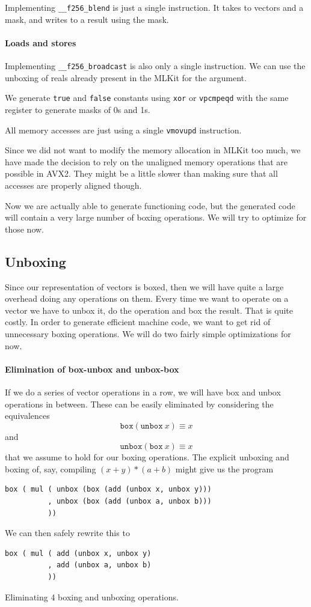 \documentclass{article}
\begin{document}
Implementing \verb!__f256_blend! is just a single instruction. It takes to vectors and a mask, and writes to a result using the mask.

\paragraph{Loads and stores}

Implementing \verb!__f256_broadcast! is also only a single instruction. We can use the unboxing of reals already present in the MLKit for the argument.

We generate \verb!true! and \verb!false! constants using \verb!xor! or \verb!vpcmpeqd! with the same register to generate masks of 0s and 1s.

All memory accesses are just using a single \verb!vmovupd! instruction.

Since we did not want to modify the memory allocation in MLKit too much, we have made the decision to rely on the unaligned memory operations that are possible in AVX2. They might be a little slower than making sure that all accesses are properly aligned though.

Now we are actually able to generate functioning code, but the generated code will contain a very large number of boxing operations. We will try to optimize for those now.

\subsection{Unboxing}

Since our representation of vectors is boxed, then we will have quite a large overhead doing any operations on them. Every time we want to operate on a vector we have to unbox it, do the operation and box the result. That is quite costly. In order to generate efficient machine code, we want to get rid of unnecessary boxing operations. We will do two fairly simple optimizations for now.

\paragraph{Elimination of box-unbox and unbox-box}
If we do a series of vector operations in a row, we will have box and unbox operations in between. These can be easily eliminated by considering the equivalences
\[
    \mathtt{box} (\mathtt{unbox}\ x) \equiv x
\]
and
\[
    \mathtt{unbox} (\mathtt{box}\ x) \equiv x
\]
that we assume to hold for our boxing operations. The explicit unboxing and boxing of, say, compiling $(x + y) * (a + b)$ might give us the program 
\begin{verbatim}
box ( mul ( unbox (box (add (unbox x, unbox y)))
          , unbox (box (add (unbox a, unbox b)))
          ))
\end{verbatim}
We can then safely rewrite this to
\begin{verbatim}
box ( mul ( add (unbox x, unbox y)
          , add (unbox a, unbox b)
          ))
\end{verbatim}
Eliminating 4 boxing and unboxing operations.
\end{document}
